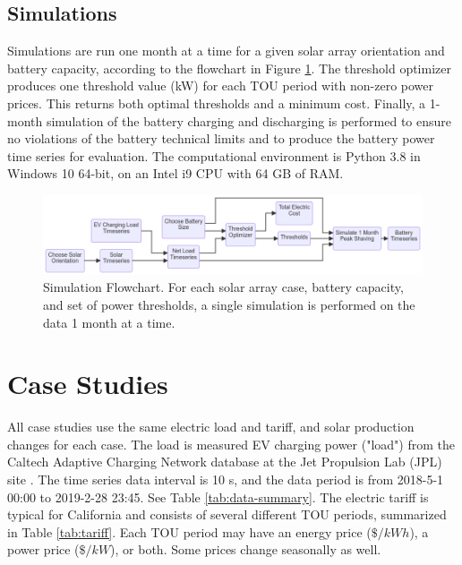 \documentclass[journal,article,submit,pdftex,moreauthors]{Definitions/mdpi}
\begin{document}
\subsection{Simulations}\label{simulations}%

Simulations are run one month at a time for a given solar array orientation and battery capacity, according to the flowchart in Figure \ref{fig:simulation-flowchart}. The threshold optimizer produces one threshold value (kW) for each TOU period with non-zero power prices. This returns both optimal thresholds and a minimum cost. Finally, a 1-month simulation of the battery charging and discharging is performed to ensure no violations of the battery technical limits and to produce the battery power time series for evaluation. The computational environment is Python 3.8 in Windows 10 64-bit, on an Intel i9 CPU with 64 GB of RAM.

\begin{figure}
  \centering
  \includegraphics[width=\linewidth]{./images/simulation flowchart.png}
  \caption{Simulation Flowchart. For each solar array case, battery capacity, and set of power thresholds, a single simulation is performed on the data 1 month at a time.}
  \label{fig:simulation-flowchart}
\end{figure}

\section{Case Studies}\label{case-studies}%

All case studies use the same electric load and tariff, and solar production changes for each case. The load is measured EV charging power ("load") from the Caltech Adaptive Charging Network database at the Jet Propulsion Lab (JPL) site \cite{Lee2021}. The time series data interval is 10 s, and the data period is from 2018-5-1 00:00 to 2019-2-28 23:45. See Table \ref{tab:data-summary}. The electric tariff is typical for California and consists of several different TOU periods, summarized in Table \ref{tab:tariff}. Each TOU period may have an energy price (\(\$/kWh\)), a power price (\(\$/kW\)), or both. Some prices change seasonally as well.
\end{document}
